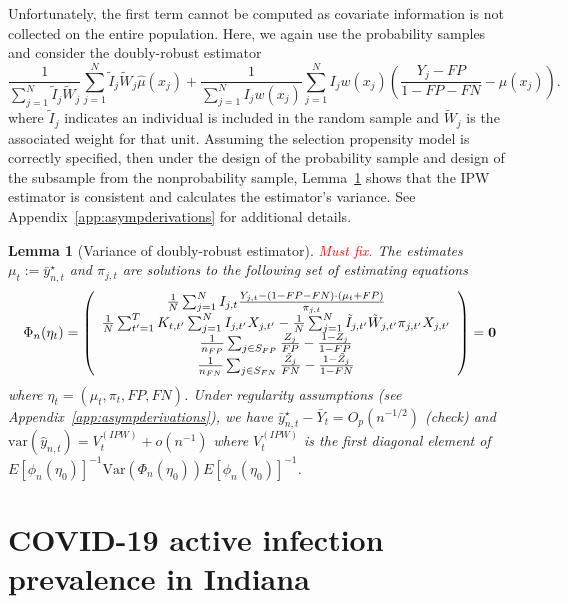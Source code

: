 \documentclass[12pt]{amsart}
\numberwithin{equation}{section}
\theoremstyle{plain}
\newtheorem{lemma}[theorem]{Lemma}
\begin{document}
Unfortunately, the first term cannot be computed as covariate information is not collected on the entire population.  Here, we again use the probability samples and consider the doubly-robust estimator
$$
\frac{1}{\sum_{j=1}^N \tilde I_j \tilde W_j} \sum_{j=1}^N  \tilde I_j \tilde W_j \hat \mu (x_j) + \frac{1}{\sum_{j=1}^N I_j w (x_j)} \sum_{j=1}^N I_j w(x_j) \left( \frac{Y_j - FP}{1 - FP - FN} - \mu(x_j) \right).
$$
where $\tilde I_j$ indicates an individual is included in the random sample and $\tilde W_j$ is the associated weight for that unit. Assuming the selection propensity model is correctly specified, then under the design of the probability sample and design of the subsample from the nonprobability sample, Lemma~\ref{lemma:dr} shows that the IPW estimator is  consistent and calculates the estimator's variance. See Appendix~\ref{app:asympderivations} for additional details.

\begin{lemma}[Variance of doubly-robust estimator] \normalfont
\label{lemma:dr}
\textcolor{red}{Must fix.}
The estimates~$\mu_t := \bar y_{n,t}^\star$ and $\hat \pi_{j,t}$
are solutions to the following set of estimating equations
$$
\Phi_n (\eta_t) =
\left (
\begin{array}{c}
\frac{1}{N} \sum_{j=1}^N I_{j,t} \frac{Y_{j,t} - (1-FP-FN) \cdot (\mu_t+FP)}{\pi_{j,t}} \\
\frac{1}{N} \sum_{t^\prime = 1}^T K_{t,t^\prime} \sum_{j=1}^N I_{j,t^\prime} X_{j,t^\prime} - \frac{1}{N} \sum_{j = 1}^N \tilde I_{j,t^\prime} \tilde W_{j,t^\prime}  \pi_{j,t^\prime} X_{j,t^\prime}  \\
\frac{1}{n_{FP}} \sum_{j \in S_{FP}} \frac{Z_j}{FP} - \frac{1-Z_j}{1-FP} \\
\frac{1}{n_{FN}} \sum_{j \in S_{FN}} \frac{\tilde Z_j}{FN} - \frac{1-\tilde Z_j}{1-FN} \\
\end{array}
\right ) = {\bf 0}
$$
where $\eta_t = (\mu_t, \pi_t, FP, FN)$. Under regularity assumptions (see Appendix~\ref{app:asympderivations}), we have $\bar y_{n,t}^\star - \bar Y_{t} = O_p (n^{-1/2})$ (check)  and $\text{var} (\hat y_{n,t}) = V_{t}^{(IPW)} + o (n^{-1})$ where $V_t^{(IPW)}$ is the first diagonal element of $E [\phi_n(\eta_0)]^{-1} \text{Var}(\Phi_n(\eta_0))E [\phi_n(\eta_0)]^{-1}$.
\end{lemma}


\section{COVID-19 active infection prevalence in Indiana}
\label{section:applications}
\end{document}
